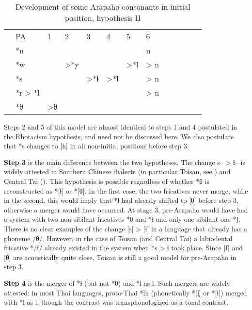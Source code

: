 \documentclass[oldfontcommands,oneside,a4paper,11pt]{article}
\newcommand{\grise}[1]{\cellcolor{lightgray}\textbf{#1}}
\begin{document}
\begin{table}[H]
\caption{Development of some Arapaho   consonants in initial position, hypothesis II}   \centering
\begin{tabular}{lllllllllllll}
&PA & 1 & 2 & 3 & 4 & 5 & 6   \\
&*n  &&&&&& n\\
&*w   && >*y  \grise{}   & \grise{}& \grise{}   &>*l \grise{} &> n \grise{}\\
&*s  && &  >*ɬ  &>*l \grise{}&  \grise{} & > n \grise{}\\
&*r > *l	 &  &  &    &  &    &> n \grise{}\\
&*θ  &  >θ\\
\end{tabular}
\end{table}
Steps 2 and 5 of this model are almost identical to steps 1 and 4 postulated in the Rhotacism hypothesis, and need not be discussed here. We also postulate that *s changes to [h] in all non-initial positions before step 3.

\textbf{Step 3} is the main difference between the two hypotheses. The change s-- > ɬ-- is widely attested in Southern Chinese dialects (in particular Toisan, see \citealt[20-21; 169-175]{hashimoto04taishan}) and Central Tai (\citealt{li77tai}). This hypothesis is possible regardless of  whether *θ is reconstructed as *[ɬ] or *[θ]. In the first case, the two fricatives never merge, while in the second, this would imply that *ɬ had already shifted to [θ] before step 3, otherwise a merger would have occurred. At stage 3, pre-Arapaho would have had a system with two non-sibilant fricatives *θ and *ɬ and only one sibilant one *ʃ. There is no clear examples of the change [s] > [ɬ]    in a language that already has a phoneme /θ/. However, in the case of Toisan (and Central Tai)  a labiodental fricative */f/ already existed in the system when *s > ɬ took place. Since [f] and [θ] are acoustically quite close, Toisan is still a good model for pre-Arapaho in step 3.


\textbf{Step 4} is the merger of *ɬ (but not *θ) and *l as l. Such mergers are widely attested: in most Thai languages, proto-Thai *lh (phonetically *[l̥] or *[ɬ]) merged with *l as l, though the contrast was transphonologized as a tonal contrast.




 
\end{document}
